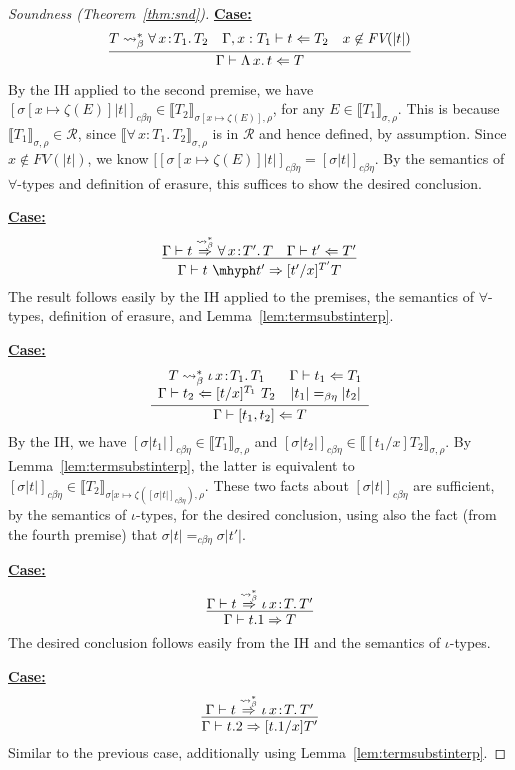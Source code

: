 \documentclass{article}
\newcommand{\choice}[0]{\zeta}
\newcommand{\abs}[4]{{#1}\, #2\! : \! #3.\, #4}
\newcommand{\absu}[3]{{#1}\, #2.\, #3}
\newcommand{\interp}[1]{\llbracket #1 \rrbracket}
\newcommand{\tpcheck}[0]{\Leftarrow}
\newcommand{\tpsynth}[0]{\Rightarrow}
\newcommand{\tpsynthleads}[0]{\ensuremath{\overset{\leadsto_\beta^*}{\Rightarrow}}}
\newcommand{\cbe}[0]{c\beta\eta}
\newcommand{\startcase}[1]{\vspace{#1} \noindent\textbf{\underline{Case:}}}
\begin{document}
\begin{proof}[Soundness (Theorem~\ref{thm:snd})]
\startcase{.2cm}
\[
  \infer{\Gamma\vdash \absu{\Lambda}{x}{t} \tpcheck T}
  {T \leadsto_\beta^* \abs{\forall}{x}{T_1}{T_2} & \Gamma,x:T_1\vdash t \tpcheck T_2 & x\not\in\textit{FV}(|t|)}
\]

By the IH applied to the second premise, we have
$[\sigma[x\mapsto\choice(E)]
|t|]_{\cbe}\in\interp{T_2}_{\sigma[x\mapsto\choice(E)],\rho}$, for any
$E\in\interp{T_1}_{\sigma,\rho}$.
This is because $\interp{T_1}_{\sigma,\rho}\in\mathcal{R}$, since
$\interp{\abs{\forall}{x}{T_1}{T_2}}_{\sigma,\rho}$ is in $\mathcal{R}$ and 
hence defined, by assumption.
Since $x\not\in\textit{FV}(|t|)$, we know
$[[\sigma[x\mapsto\choice(E)]|t|]_{\cbe} = [\sigma |t|]_{\cbe}$.
By the semantics of $\forall$-types and definition of erasure, this suffices to
show the desired conclusion.

\startcase{.2cm}
\[
  \infer{\Gamma\vdash t\ \mhyph t' \tpsynth [t'/x]^{T'}T}{\Gamma\vdash t \tpsynthleads \abs{\forall}{x}{T'}{T} & \Gamma\vdash t' \tpcheck T'} \\ \\
\]
The result follows easily by the IH applied to the premises, the
semantics of $\forall$-types, definition of erasure, and Lemma~\ref{lem:termsubstinterp}.


\startcase{.2cm}
\[
  \infer{\Gamma\vdash [ t_1 , t_2 ] \tpcheck T}
  {
    \begin{array}{cc}
      T \leadsto_\beta^* \abs{\iota}{x}{T_1}{T_1}
      & \Gamma \vdash t_1 \tpcheck T_1
      \\ \Gamma \vdash t_2 \tpcheck [t/x]^{T_1}\ T_2
      & |t_1| =_{\beta\eta} |t_2|
    \end{array}
  }
\]
By the IH, we have $[\sigma |t_1|]_{\cbe}\in\interp{T_1}_{\sigma,\rho}$ and
$[\sigma |t_2|]_{\cbe}\in\interp{[t_1/x]T_2}_{\sigma,\rho}$.
By Lemma~\ref{lem:termsubstinterp}, the latter is equivalent to
$[\sigma |t|]_{\cbe}\in\interp{T_2}_{\sigma[x\mapsto\choice([\sigma
  |t|]_{\cbe}),\rho}$.
These two facts about $[\sigma |t|]_{\cbe}$ are
sufficient, by the semantics of $\iota$-types, for the desired
conclusion, using also the fact (from the fourth premise) that $\sigma|t| =_{\cbe} \sigma|t'|$.

\startcase{.2cm}
\[
  \infer{\Gamma\vdash t.1 \tpsynth T}{\Gamma\vdash t \tpsynthleads \abs{\iota}{x}{T}{T'}}
\]
The desired conclusion follows easily from the IH and the semantics of $\iota$-types.

\startcase{.2cm}
\[
  \infer{\Gamma\vdash t.2 \tpsynth [t.1/x] T'}{\Gamma\vdash t \tpsynthleads \abs{\iota}{x}{T}{T'}}
\]
Similar to the previous case, additionally using Lemma~\ref{lem:termsubstinterp}.


\end{proof}
\end{document}
